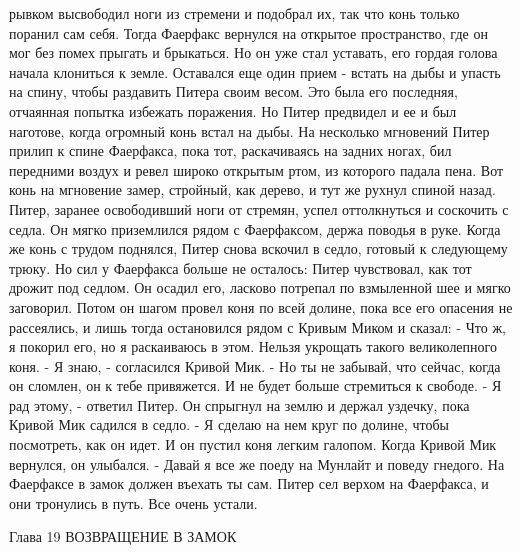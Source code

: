рывком высвободил ноги из стремени и подобрал их, так что конь только 
поранил сам себя. Тогда Фаерфакс вернулся на открытое пространство, 
где он мог без помех прыгать и брыкаться. Но он уже стал уставать, его 
гордая голова начала клониться к земле. Оставался еще один прием - 
встать на дыбы и упасть на спину, чтобы раздавить Питера своим весом. 
Это была его последняя, отчаянная попытка избежать поражения.
    Но Питер предвидел и ее и был наготове, когда огромный конь встал 
на дыбы. На несколько мгновений Питер прилип к спине Фаерфакса, пока 
тот, раскачиваясь на задних ногах, бил передними воздух и ревел широко 
открытым ртом, из которого падала пена. Вот конь на мгновение замер, 
стройный, как дерево, и тут же рухнул спиной назад. Питер, заранее 
освободивший ноги от стремян, успел оттолкнуться и соскочить с седла. 
Он мягко приземлился рядом с Фаерфаксом, держа поводья в руке. Когда 
же конь с трудом поднялся, Питер снова вскочил в седло, готовый к 
следующему трюку.
    Но сил у Фаерфакса больше не осталось: Питер чувствовал, как тот 
дрожит под седлом. Он осадил его, ласково потрепал по взмыленной шее и 
мягко заговорил. Потом он шагом провел коня по всей долине, пока все 
его опасения не рассеялись, и лишь тогда остановился рядом с Кривым 
Миком и сказал:
    - Что ж, я покорил его, но я раскаиваюсь в этом. Нельзя укрощать 
такого великолепного коня.
    - Я знаю, - согласился Кривой Мик. - Но ты не забывай, что сейчас, 
когда он сломлен, он к тебе привяжется. И не будет больше стремиться к 
свободе.
    - Я рад этому, - ответил Питер.
    Он спрыгнул на землю и держал уздечку, пока Кривой Мик садился в 
седло.
    - Я сделаю на нем круг по долине, чтобы посмотреть, как он идет.
    И он пустил коня легким галопом. Когда Кривой Мик вернулся, он 
улыбался.
    - Давай я все же поеду на Мунлайт и поведу гнедого. На Фаерфаксе в 
замок должен въехать ты сам.
    Питер сел верхом на Фаерфакса, и они тронулись в путь. Все очень 
устали.

        Глава 19
        ВОЗВРАЩЕНИЕ В ЗАМОК

